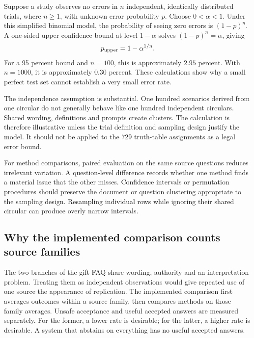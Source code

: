 Suppose a study observes no errors in $n$ independent, identically distributed
trials, where $n\geq1$, with unknown error probability $p$. Choose
$0<\alpha<1$. Under this simplified binomial model,
the probability of seeing zero errors is $(1-p)^n$. A one-sided upper confidence
bound at level $1-\alpha$ solves $(1-p)^n=\alpha$, giving
\begin{equation}
 p_{\rm upper}=1-\alpha^{1/n}.
 \label{eq:zero-errors}
\end{equation}
For a 95 percent bound and $n=100$, this is approximately $2.95$ percent. With
$n=1000$, it is approximately $0.30$ percent. These calculations show why a small
perfect test set cannot establish a very small error rate.

The independence assumption is substantial. One hundred scenarios derived from
one circular do not generally behave like one hundred independent circulars.
Shared wording, definitions and prompts create clusters. The calculation is
therefore illustrative unless the trial definition and sampling design justify
the model. It should not be applied to the 729 truth-table assignments as a legal
error bound.


For method comparisons, paired evaluation on the same source questions reduces
irrelevant variation. A question-level difference records whether one method
finds a material issue that the other misses. Confidence intervals or permutation
procedures should preserve the document or question clustering appropriate to the
sampling design. Resampling individual rows while ignoring their shared circular
can produce overly narrow intervals.

\subsection{Why the implemented comparison counts source families}
\label{sec:family-comparison}

The two branches of the gift FAQ share wording, authority and an interpretation
problem. Treating them as independent observations would give repeated use of
one source the appearance of replication. The implemented comparison first
averages outcomes within a source family, then compares methods on those family
averages. Unsafe acceptance and useful accepted answers are measured separately.
For the former, a lower rate is desirable; for the latter, a higher rate is
desirable. A system that abstains on everything has no useful accepted answers.

